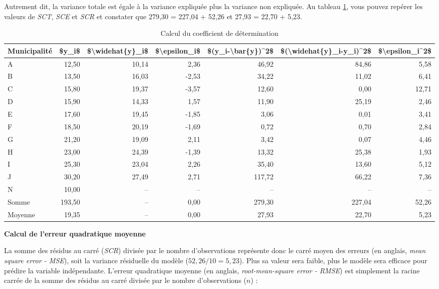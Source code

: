 \documentclass[
  11pt,
  french,
]{book}
\begin{document}
Autrement dit, la variance totale est égale à la variance expliquée plus la variance non expliquée. Au tableau \ref{tab:computeR}, vous pouvez repérer les valeurs de \emph{SCT}, \emph{SCE} et \emph{SCR} et constater que 279,30 = 227,04 + 52,26 et 27,93 = 22,70 + 5,23.

\begin{table}

\caption{\label{tab:computeR}Calcul du coefficient de détermination}
\centering
\fontsize{8}{10}\selectfont
\begin{tabular}[t]{lrrrrrr}
\toprule
Municipalité & \$y\_i\$ & \$\textbackslash{}widehat\{y\}\_i\$ & \$\textbackslash{}epsilon\_i\$ & \$(y\_i-\textbackslash{}bar\{y\})\textasciicircum{}2\$ & \$(\textbackslash{}widehat\{y\}\_i-y\_i)\textasciicircum{}2\$ & \$\textbackslash{}epsilon\_i\textasciicircum{}2\$\\
\midrule
A & 12,50 & 10,14 & 2,36 & 46,92 & 84,86 & 5,58\\
B & 13,50 & 16,03 & -2,53 & 34,22 & 11,02 & 6,41\\
C & 15,80 & 19,37 & -3,57 & 12,60 & 0,00 & 12,71\\
D & 15,90 & 14,33 & 1,57 & 11,90 & 25,19 & 2,46\\
E & 17,60 & 19,45 & -1,85 & 3,06 & 0,01 & 3,41\\
\addlinespace
F & 18,50 & 20,19 & -1,69 & 0,72 & 0,70 & 2,84\\
G & 21,20 & 19,09 & 2,11 & 3,42 & 0,07 & 4,46\\
H & 23,00 & 24,39 & -1,39 & 13,32 & 25,38 & 1,93\\
I & 25,30 & 23,04 & 2,26 & 35,40 & 13,60 & 5,12\\
J & 30,20 & 27,49 & 2,71 & 117,72 & 66,22 & 7,36\\
\addlinespace
N & 10,00 & -- & -- & -- & -- & --\\
Somme & 193,50 & -- & 0,00 & 279,30 & 227,04 & 52,26\\
Moyenne & 19,35 & -- & 0,00 & 27,93 & 22,70 & 5,23\\
\bottomrule
\end{tabular}
\end{table}

\textbf{Calcul de l'erreur quadratique moyenne}

La somme des résidus au carré (\emph{SCR}) divisée par le nombre d'observations représente donc le carré moyen des erreurs (en anglais, \emph{mean square error - MSE}), soit la variance résiduelle du modèle (\(52,26 / 10 = 5,23\)). Plus sa valeur sera faible, plus le modèle sera efficace pour prédire la variable indépendante. L'erreur quadratique moyenne (en anglais, \emph{root-mean-square error - RMSE}) est simplement la racine carrée de la somme des résidus au carré divisée par le nombre d'observations (\(n\)) :
\end{document}
